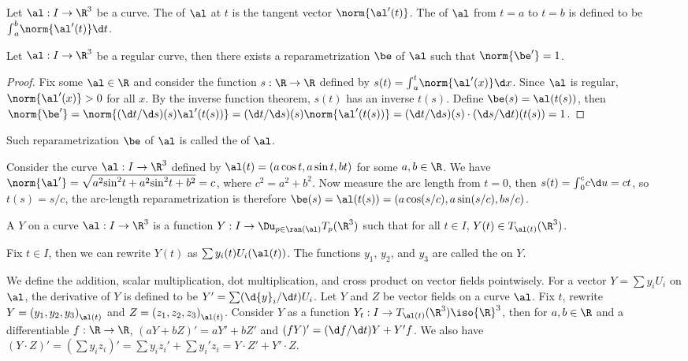 \documentclass[10pt]{article}
\begin{document}
\begin{definition}
    Let $\al:I\to{\R}^{3}$ be a curve. The  of $\al$ at $t$ is the tangent vector $\norm{\al'(t)}$. The  of $\al$ from $t=a$ to $t=b$ is defined to be ${\int}_{a}^{b}\norm{\al'(t)}\d t$.
\end{definition}
\begin{proposition}
    Let $\al:I\to{\R}^{3}$ be a regular curve, then there exists a reparametrization $\be$ of $\al$ such that $\norm{\be'}=1$.
\end{proposition}
\begin{proof}
    Fix some $\al\in\R$ and consider the function $s:\R\to\R$ defined by $s(t)={\int}_{a}^{t}\norm{\al'(x)}\d x$. Since $\al$ is regular, $\norm{\al'(x)}>0$ for all $x$. By the inverse function theorem, $s(t)$ has an inverse $t(s)$. Define $\be(s)=\al(t(s))$, then $\norm{\be'}=\norm{(\d t/\d s)(s)\al'(t(s))}=(\d t/\d s)(s)\norm{\al'(t(s))}=(\d t/\d s)(s)\cdot(\d s/\d t)(t(s))=1$.
\end{proof}
\par
Such reparametrization $\be$ of $\al$ is called the  of $\al$.
\begin{example}
    Consider the curve $\al:I\to{\R}^{3}$ defined by $\al(t)=(a\cos t,a\sin t,bt)$ for some $a,b\in\R$. We have $\norm{\al'}=\sqrt{{a}^{2}{\sin}^{2}t+{a}^{2}{\sin}^{2}t+{b}^{2}}=c$, where ${c}^{2}={a}^{2}+{b}^{2}$. Now measure the arc length from $t=0$, then $s(t)={\int}_{0}^{c}c\d u=ct$, so $t(s)=s/c$, the arc-length reparametrization is therefore $\be(s)=\al(t(s))=(a\cos(s/c),a\sin(s/c),bs/c)$.
\end{example}
\begin{definition}
    A  $Y$ on a curve $\al:I\to{\R}^{3}$ is a function $Y:I\to{\Du}_{p\in\ran(\al)}{T}_{p}({\R}^{3})$ such that for all $t\in I$, $Y(t)\in{T}_{\al(t)}({\R}^{3})$.
\end{definition}
\par
Fix $t\in I$, then we can rewrite $Y(t)$ as $\sum{y}_{i}(t){U}_{i}(\al(t))$. The functions ${y}_{1}$, ${y}_{2}$, and ${y}_{3}$ are called the  on $Y$. 
\par
We define the addition, scalar multiplication, dot multiplication, and cross product on vector fields pointwisely. For a vector $Y=\sum{y}_{i}{U}_{i}$ on $\al$, the derivative of $Y$ is defined to be $Y'=\sum(\d{y}_{i}/\d t){U}_{i}$. Let $Y$ and $Z$ be vector fields on a curve $\al$. Fix $t$, rewrite $Y={({y}_{1},{y}_{2},{y}_{3})}_{\al(t)}$ and $Z={({z}_{1},{z}_{2},{z}_{3})}_{\al(t)}$. Consider $Y$ as a function ${Y}_{t}:I\to{T}_{\al(t)}({\R}^{3})\iso{\R}^{3}$, then for $a,b\in\R$ and a differentiable $f:\R\to\R$, $(aY+bZ)'=aY'+bZ'$ and $(fY)'=(\d f/\d t)Y+Y'f$. We also have $(Y\cdot Z)'=(\sum{y}_{i}{z}_{i})'=\sum{y}_{i}{z}_{i}'+\sum{y}_{i}'{z}_{i}=Y\cdot Z'+Y'\cdot Z$.
\end{document}
